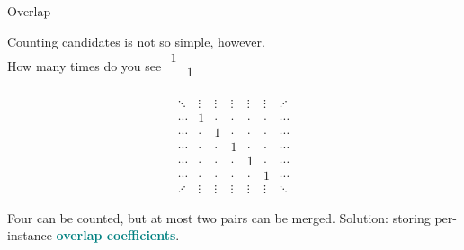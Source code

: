 \documentclass[11pt]{beamer}
\renewcommand{\bold}[1]{\textcolor{teal}{\textbf{#1}}}
\begin{document}

\begin{frame}{Overlap}

Counting candidates is not so simple, however.\\ How many times do you see $\begin{matrix}
1 &   \\[-.2em]
 & 1  \\[-.2em]
\end{matrix}$

$$
\begin{matrix}
\ddots & \vdots & \vdots & \vdots & \vdots & \vdots & \iddots \\[-.2em]
\cdots & 1     & \cdot & \cdot & \cdot & \cdot  & \cdots \\[-.2em]
\cdots & \cdot & 1     & \cdot & \cdot & \cdot & \cdots \\[-.2em]
\cdots & \cdot & \cdot & 1    & \cdot & \cdot & \cdots \\[-.2em]
\cdots & \cdot & \cdot & \cdot & 1    & \cdot & \cdots \\[-.2em]
\cdots & \cdot & \cdot & \cdot & \cdot & 1   &  \cdots \\[-.4em]
\iddots & \vdots & \vdots & \vdots & \vdots & \vdots & \ddots
\end{matrix}
$$

Four can be counted, but at most two pairs can be merged. Solution: storing per-instance \bold{overlap coefficients}.

\end{frame}


\end{document}
